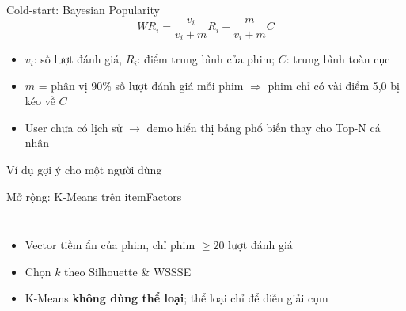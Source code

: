 \begin{frame}{Cold-start: Bayesian Popularity}
  \[
    WR_i = \frac{v_i}{v_i + m} R_i + \frac{m}{v_i + m} C
  \]
  \begin{itemize}
    \item $v_i$: số lượt đánh giá, $R_i$: điểm trung bình của phim; $C$: trung bình toàn cục
    \item $m$ = phân vị 90\% số lượt đánh giá mỗi phim $\Rightarrow$ phim chỉ có vài điểm 5,0 bị kéo về $C$
    \item User chưa có lịch sử $\rightarrow$ demo hiển thị bảng phổ biến thay cho Top-N cá nhân
  \end{itemize}
\end{frame}

\begin{frame}{Ví dụ gợi ý cho một người dùng}
\end{frame}

\begin{frame}{Mở rộng: K-Means trên itemFactors}
  \begin{columns}[c]
    \centering
    \begin{itemize}
      \item Vector tiềm ẩn của phim, chỉ phim $\ge 20$ lượt đánh giá
      \item Chọn $k$ theo Silhouette \& WSSSE
      \item K-Means \textbf{không dùng thể loại}; thể loại chỉ để diễn giải cụm
    \end{itemize}
  \end{columns}
\end{frame}

